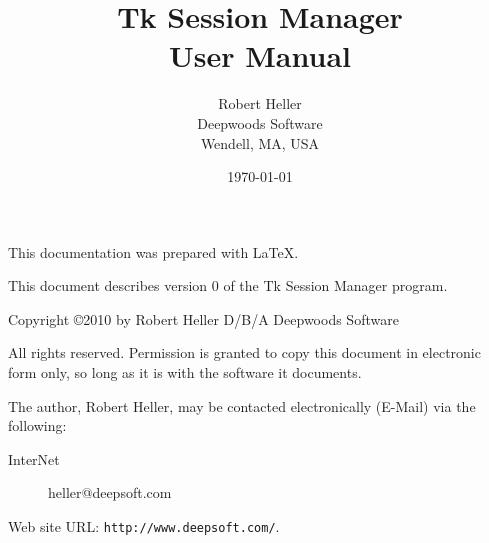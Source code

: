 \documentclass[12pt,notitlepage,twoside]{book}
\begin{document}
\title{Tk Session Manager \\ User Manual}
\author{Robert Heller \\ Deepwoods Software \\ Wendell, MA, USA}
\date{\today}
\begin{titlepage}

\maketitle

\clearpage


This documentation was prepared with \LaTeX.

This document describes version 0 of the Tk Session Manager program.

{\small Copyright \copyright 2010 by Robert Heller D/B/A Deepwoods Software}

\vspace{.25in}

All rights reserved.  Permission is granted to copy this document in
electronic form only, so long as it is with the software it
documents. 

The author, Robert Heller, may be contacted electronically (E-Mail) via
the following:

\begin{description}
\item[InterNet] heller@deepsoft.com
\end{description}

Web site URL: {\tt http://www.deepsoft.com/}.

\thispagestyle{empty}
\setcounter{page}{0}
\clearpage

\end{titlepage}


\tableofcontents
\listoffigures
\listoftables
\cleardoublepage
%       
%       

%
\cleardoublepage
{}
%






{\footnotesize
 
}
\cleardoublepage
\printindex
\end{document}
